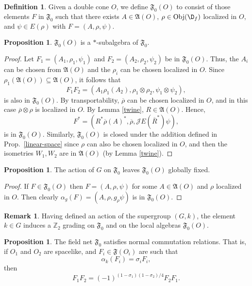 \documentclass[11pt]{article}
\newcommand{\alg}[1]{\mathfrak{#1}}
\theoremstyle{definition}
\newtheorem{prop}[thm]{Proposition}
\theoremstyle{definition}
\newtheorem{defn}[thm]{Definition}
\newtheorem{note}[thm]{Remark}
\theoremstyle{remark}
\newcommand{\Obj}{\mathrm{Obj}}
\def\7#1{{\mathbb #1}}
\def\ol#1{{\overline #1}}
\def\a{\alpha} \def\b{\beta} \def\g{\gamma} \def\d{\delta}
\begin{document}
\begin{defn} Given a double cone $O$, we define $\alg{F}_0 (O)$ to consist of those
  elements $F$ in $\alg{F}_0 $ such that there exists $A\in \alg{A}(O)$, $\rho \in
  \Obj (\D _f )$ localized in $O$, and $\psi \in E(\rho )$ with $F=(A,\rho ,\psi )$.
\end{defn}

\begin{prop} $\alg{F}_0 (O)$ is a $*$-subalgebra of $\alg{F}_0 $.  \end{prop}

\begin{proof} Let $F_1=(A_1,\rho _1,\psi _1)$ and $F_2=(A_2,\rho _2,\psi _2)$ be in
  $\alg{F}_0 (O)$.  Thus, the $A_i$ can be chosen from $\alg{A}(O)$ and the $\rho _i$
  can be chosen localized in $O$.  Since $\rho _1(\alg{A}(O))\subseteq \alg{A}(O)$,
  it follows that 
$$ F_1F_2 = (A_1\rho _1(A_2),\rho _1\otimes \rho _2,\psi _1\otimes \psi _2) ,$$
is also in $\alg{F}_0 (O)$.  By transportability, $\ol\rho$ can be chosen localized in
$O$, and in this case $\ol\rho \otimes \rho$ is localized in $O$.  By Lemma
\ref{twine}, $R\in \alg{A}(O)$.  Hence,
$$ F^*=(R^*\ol\rho (A)^*,\ol\rho ,\mathcal{J}E(\ol R^*)\psi ) ,$$
is in $\alg{F}_0 (O)$.  Similarly, $\alg{F}_0 (O)$ is closed under the addition defined in
Prop.\ \ref{linear-space} since $\rho$ can also be chosen localized in $O$, and then
the isometries $W_1,W_2$ are in $\alg{A}(O)$ (by Lemma \ref{twine}).
\end{proof}


\begin{prop} The action of $G$ on $\alg{F}_0$ leaves $\alg{F}_0(O)$ globally fixed.
\end{prop}

\begin{proof} If $F\in \alg{F}_0(O)$ then $F=(A,\rho ,\psi )$ for some $A\in
  \alg{A}(O)$ and $\rho$ localized in $O$.  Then clearly $\a _g(F)=(A,\rho ,g_\rho
  \psi )$ is in $\alg{F} _0(O)$.  \end{proof}

\begin{note} Having defined an action of the supergroup $(G,k)$, the element $k\in G$
  induces a $\7Z _2$ grading on $\alg{F}_0$ and on the local algebras
  $\alg{F}_0(O)$.  

\end{note}



\begin{prop} The field net $\alg{F}_0$ satisfies normal commutation relations.  That
  is, if $O_1$ and $O_2$ are spacelike, and $F_i\in \alg{F}(O_i)$ are such that
  $$ \alpha _k(F_{i})=\sigma _iF_i ,$$ then
  $$ F_1F_2= (-1)^{(1-\sigma _1)(1-\sigma _2)/4}F_2F_1 .$$ \label{normality}
\end{prop}
\end{document}
